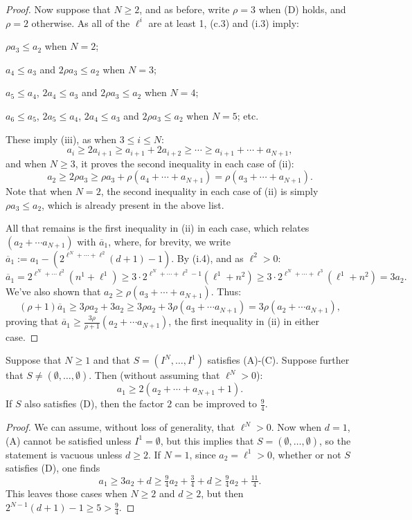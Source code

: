 \documentclass[10pt]{article}
\begin{document}
\begin{KoszulSequenceCombinatorics}
\begin{proof}
Now suppose that $N\geq2$, and as before, write $\rho=3$ when \textup{(D)} holds, and $\rho=2$ otherwise. As all of the $\ell^i$ are at least 1, \textup{(c.3)} and \textup{(i.3)} imply:
\begin{itemise}
\item $\rho a_3\leq a_2$ when $N=2$;
\item $a_4\leq a_3$ and $2\rho a_3\leq a_2$ when $N=3$;
\item $a_5\leq a_4$, $2a_4\leq a_3$ and $2\rho a_3\leq a_2$ when $N=4$;
\item $a_6\leq a_5$, $2a_5\leq a_4$, $2a_4\leq a_3$ and $2\rho a_3\leq a_2$ when $N=5$; etc.
\end{itemise}
These imply (iii), as when $3\leq i\leq N$:
\[a_i\geq 2a_{i+1}\geq a_{i+1}+2a_{i+2}\geq\cdots \geq a_{i+1}+\cdots +a_{N+1},\]
and when $N\geq3$, it proves the second inequality in each case of (ii):
\[a_2\geq 2\rho a_3\geq \rho a_3+\rho (a_4+\cdots +a_{N+1})=\rho (a_3+\cdots +a_{N+1}).\]
Note that when $N=2$, the second inequality in each case of (ii) is simply $\rho a_3\leq a_2$, which is already present in the above list.

All that remains is the first inequality in (ii) in each case, which relates $(a_2+\cdots a_{N+1})$ with $\overline{a}_1$, where, for brevity, we write $\overline{a}_1:=a_1-(2^{\ell^N+\cdots +\ell^2}(d+1)-1)$.
By \textup{(i.4)}, and as $\ell^2>0$:%
\[\overline{a}_1=2^{\ell^N+\cdots \ell^2}(n^1+\ell^1)\geq 3\cdot2^{\ell^N+\cdots +\ell^2-1}(\ell^1+n^2)\geq 3\cdot2^{\ell^N+\cdots +\ell^3}(\ell^1+n^2) =3a_2.\]
We've also shown that $a_2\geq\rho (a_3+\cdots +a_{N+1})$. Thus:
\[(\rho+1)\overline{a}_1\geq 3\rho a_2+3a_2 \geq 3\rho a_2+3\rho (a_3+\cdots a_{N+1})=3\rho(a_2+\cdots a_{N+1}),\]
proving that $\overline{a}_1\geq\frac{3\rho}{\rho+1}(a_2+\cdots a_{N+1})$, the first inequality in (ii) in either case.
\end{proof}

\begin{cor}Suppose that $N\geq1$ and that $S=(I^N,\ldots,I^1)$ satisfies \textup{(A)}-\textup{(C)}. Suppose further that $S\neq(\emptyset,\ldots,\emptyset)$. Then (without assuming that $\ell^N>0$):
\[a_1\geq2(a_2+\cdots +a_{N+1}+1).\]
If $S$ also satisfies \textup{(D)}, then the factor $2$ can be improved to $\tfrac{9}{4}$.
\end{cor}
\begin{proof}
We can assume, without loss of generality, that $\ell^N>0$. Now when $d=1$, \textup{(A)} cannot be satisfied unless $I^1=\emptyset$, but this implies that $S=(\emptyset,\ldots,\emptyset)$, so the statement is vacuous unless $d\geq2$. If $N=1$, since $a_2=\ell^1>0$, whether or not $S$ satisfies \textup{(D)}, one finds
\[a_1\geq 3a_2+d \geq \tfrac{9}{4}a_2+ \tfrac{3}{4}+d\geq\tfrac{9}{4}a_2+\tfrac{11}{4}.\]
This leaves those cases when $N\geq2$ and $d\geq2$, but then $2^{N-1}(d+1)-1\geq5>\tfrac{9}{4}$.
\end{proof}
\end{KoszulSequenceCombinatorics}
\end{document}
